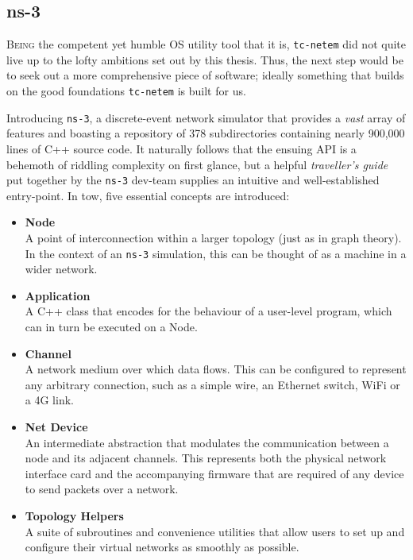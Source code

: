 \subsection{ns-3}\label{subsection:ns_3}

\lettrine{B}{eing} the competent yet humble OS utility tool that it is, \texttt{tc-netem} did not quite live up to the
lofty ambitions set out by this thesis. Thus, the next step would be to seek out a more comprehensive piece of software;
ideally something that builds on the good foundations \texttt{tc-netem} is built for us.

Introducing \texttt{ns-3}, a discrete-event network simulator that provides a \emph{vast} array of
features\cite{ns_3_man} and boasting a repository of 378 subdirectories containing nearly 900,000 lines of C++ source
code\cite{ns_3_gitlab}. It naturally follows that the ensuing API is a behemoth of riddling complexity on first
glance, but a helpful \emph{traveller's guide} put together by the \texttt{ns-3} dev-team supplies an intuitive and
well-established entry-point\cite{ns_3_man_pdf}. In tow, five essential concepts are introduced:
\begin{itemize}
    \item \textbf{Node} \\
    A point of interconnection within a larger topology (just as in graph theory). In the context of an \texttt{ns-3}
    simulation, this can be thought of as a machine in a wider network.
    \item \textbf{Application} \\
    A C++ class that encodes for the behaviour of a user-level program, which can in turn be executed on a Node.
    \item \textbf{Channel} \\
    A network medium over which data flows. This can be configured to represent any arbitrary connection, such as a
    simple wire, an Ethernet switch, WiFi or a 4G link.
    \item \textbf{Net Device} \\
    An intermediate abstraction that modulates the communication between a node and its adjacent channels. This
    represents both the physical network interface card and the accompanying firmware that are required of any device
    to send packets over a network.
    \item \textbf{Topology Helpers} \\
    A suite of subroutines and convenience utilities that allow users to set up and configure their virtual networks
    as smoothly as possible.
\end{itemize}

